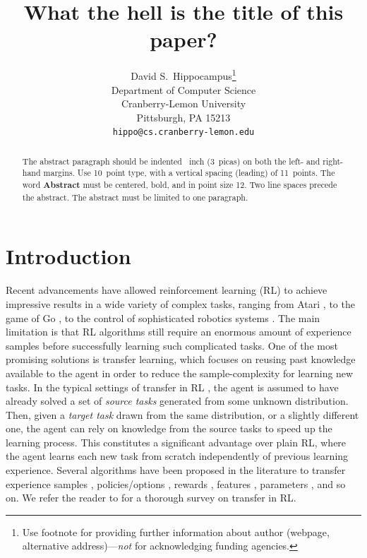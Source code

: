 \documentclass{article}
\title{What the hell is the title of this paper?}
\author{
  David S.~Hippocampus\thanks{Use footnote for providing further
    information about author (webpage, alternative
    address)---\emph{not} for acknowledging funding agencies.} \\
  Department of Computer Science\\
  Cranberry-Lemon University\\
  Pittsburgh, PA 15213 \\
  \texttt{hippo@cs.cranberry-lemon.edu} \\
}
\begin{document}

\maketitle

\begin{abstract}
  The abstract paragraph should be indented ~inch
  (3~picas) on both the left- and right-hand margins. Use 10~point
  type, with a vertical spacing (leading) of 11~points.  The word
  \textbf{Abstract} must be centered, bold, and in point size 12. Two
  line spaces precede the abstract. The abstract must be limited to
  one paragraph.
\end{abstract}

\section{Introduction}

Recent advancements have allowed reinforcement learning (RL) \cite{sutton1998reinforcement} to achieve impressive results in a wide variety of complex tasks, ranging from Atari \cite{mnih2015human}, to the game of Go \cite{silver2016mastering}, to the control of sophisticated robotics systems \cite{kober2009policy,lillicrap2015continuous,levine2016end}. The main limitation is that RL algorithms still require an enormous amount of experience samples before successfully learning such complicated tasks. One of the most promising solutions is transfer learning, which focuses on reusing past knowledge available to the agent in order to reduce the sample-complexity for learning new tasks. In the typical settings of transfer in RL \cite{taylor2009transfer}, the agent is assumed to have already solved a set of \textit{source tasks} generated from some unknown distribution. Then, given a \textit{target task} drawn from the same distribution, or a slightly different one, the agent can rely on knowledge from the source tasks to speed up the learning process. This constitutes a significant advantage over plain RL, where the agent learns each new task from scratch independently of previous learning experience. Several algorithms have been proposed in the literature to transfer experience samples \cite{lazaric2008transfer,taylor2008transferring}, policies/options \cite{fernandez2006probabilistic,konidaris2007building}, rewards \cite{konidaris2006autonomous}, features \cite{barreto2017successor}, parameters \cite{doshi2016hidden,killian2017robust}, and so on. We refer the reader to \cite{taylor2009transfer} for a thorough survey on transfer in RL.
\end{document}
